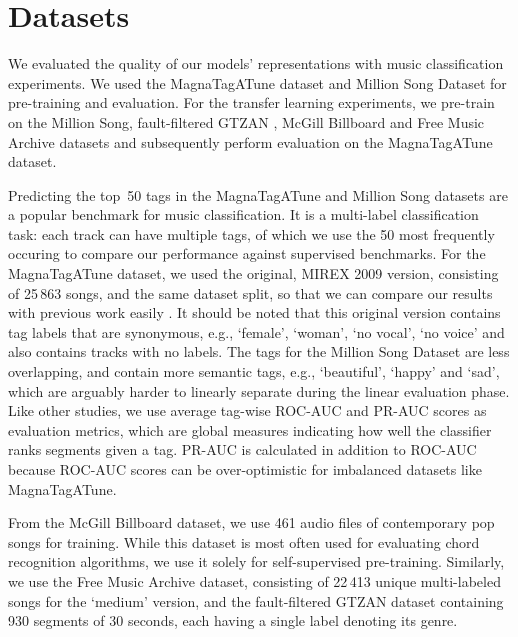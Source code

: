 
\chapter{Datasets}


We evaluated the quality of our models' representations with music classification experiments. We used the MagnaTagATune \cite{law2009evaluation} dataset and Million Song Dataset \cite{Bertin-Mahieux2011} for pre-training and evaluation. For the transfer learning experiments, we pre-train on the Million Song, fault-filtered GTZAN \cite{tzanetakis2002musical,sturm2013gtzan}, McGill Billboard \cite{burgoyne_billboard} and Free Music Archive \cite{fma_dataset} datasets and subsequently perform evaluation on the MagnaTagATune dataset. 

Predicting the top~50 tags in the Magna\-Tag\-A\-Tune and Million Song datasets are a popular benchmark for music classification. It is a multi-label classification task: each track can have multiple tags, of which we use the 50 most frequently occuring to compare our performance against supervised benchmarks. 
For the Magna\-Tag\-A\-Tune dataset, we used the original, MIREX 2009 version, consisting of 25\,863 songs, and the same dataset split, so that we can compare our results with previous work easily \cite{pons_end--end_2017, lee2018samplecnn, dieleman_feature_learning}. It should be noted that this original version contains tag labels that are synonymous, e.g., `female', `woman', `no vocal', `no voice' and also contains tracks with no labels. The tags for the Million Song Dataset are less overlapping, and contain more semantic tags, e.g., `beautiful', `happy' and `sad', which are arguably harder to linearly separate during the linear evaluation phase.
Like other studies, we use average tag-wise ROC-AUC and PR-AUC scores as evaluation metrics, which are global measures indicating how well the classifier ranks segments given a tag. PR-AUC is calculated in addition to ROC-AUC because ROC-AUC scores can be over-optimistic for imbalanced datasets like Magna\-Tag\-A\-Tune\cite{pons_end--end_2017}. 

From the McGill Billboard dataset, we use 461 audio files of contemporary pop songs for training. While this dataset is most often used for evaluating chord recognition algorithms, we use it solely for self-supervised pre-training.
Similarly, we use the Free Music Archive dataset, consisting of 22\,413 unique multi-labeled songs for the `medium' version, and the fault-filtered GTZAN dataset containing 930 segments of 30 seconds, each having a single label denoting its genre.


